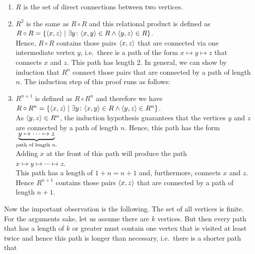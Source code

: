 \begin{enumerate}
\item $R$ is the set of direct connections between two vertices.
\item $R^2$ is the same as $R \circ R$ and this relational product is defined as
      \\[0.2cm]
      \hspace*{1.3cm}
       $R \circ R = \{ \pair(x,z) \mid \exists y \colon \pair(x,y) \in R \wedge \pair(y,z) \in R \}$.
      \\[0.2cm]
      Hence, $R \circ R$ contains those pairs $\pair(x,z)$ that are connected via one intermediate vertex $y$,
      i.e.~there is a path of the form $x \mapsto y \mapsto z$ that connects $x$ and $z$.  This path
      has length 2.  In general, we can show by induction that $R^n$ connect those pairs that are
      connected by a path of length $n$.  The induction step of this proof runs as follows:
\item $R^{n+1}$ is defined as $R \circ R^{n}$ and therefore we have
      \\[0.2cm]
      \hspace*{1.3cm}
      $R \circ R^n = \{ \pair(x,z) \mid \exists y \colon \pair(x,y) \in R \wedge \pair(y,z) \in R^n \}$.
      \\[0.2cm]
      As $\pair(y,z) \in R^n$, the induction hypothesis guarantees that the vertices $y$ and $z$ are
      connected by a path of length $n$.  Hence, this 
      path has the form
      \\[0.2cm]
      \hspace*{1.3cm}
      $\underbrace{y \mapsto \cdots \mapsto z}_{\mbox{\scriptsize path of length $n$.}}$
      \\[0.2cm]
      Adding $x$ at the front of this path will produce the path
      \\[0.2cm]
      \hspace*{1.3cm}
      $x \mapsto y \mapsto \cdots \mapsto z$.
      \\[0.2cm]
      This path has a length of $1 + n = n + 1$ and, furthermore, connects $x$ and $z$.  Hence $R^{n+1}$
      contains those pairs $\pair(x, z)$ that are connected by a path of length $n+1$.
\end{enumerate}
Now the important observation is the following. The set of all vertices is finite.  For the arguments sake, let
us assume there are $k$ vertices.  But then every path that has a length of  $k$ or greater must contain one
vertex that is visited at least twice and hence this path is longer than necessary, i.e.~there is a shorter path that
